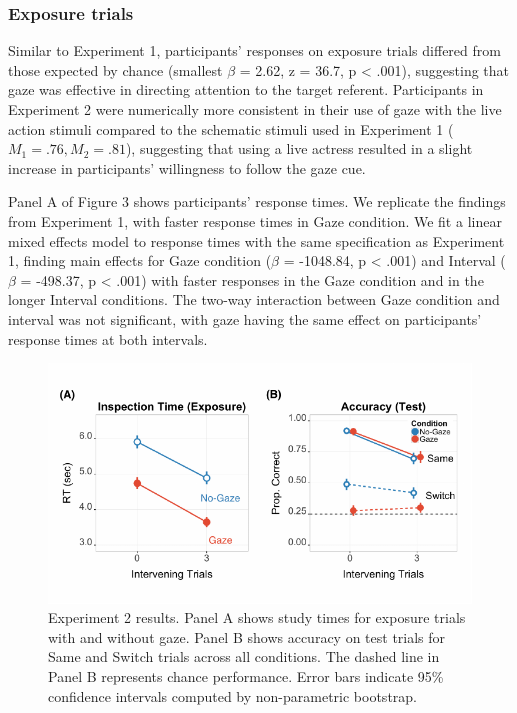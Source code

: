 \documentclass[authoryear, review]{elsarticle}
\newenvironment{CodeChunk}{}{}
\begin{document}
\subsubsection{Exposure trials}\label{exposure-trials-1}

Similar to Experiment 1, participants' responses on exposure trials
differed from those expected by chance (smallest \(\beta\) = 2.62, z =
36.7, p \textless{} .001), suggesting that gaze was effective in
directing attention to the target referent. Participants in Experiment 2
were numerically more consistent in their use of gaze with the live
action stimuli compared to the schematic stimuli used in Experiment 1
(\(M_1 = .76, M_2 = .81\)), suggesting that using a live actress
resulted in a slight increase in participants' willingness to follow the
gaze cue.

Panel A of Figure 3 shows participants' response times. We replicate the
findings from Experiment 1, with faster response times in Gaze
condition. We fit a linear mixed effects model to response times with
the same specification as Experiment 1, finding main effects for Gaze
condition (\(\beta\) = -1048.84, p \textless{} .001) and Interval
(\(\beta\) = -498.37, p \textless{} .001) with faster responses in the
Gaze condition and in the longer Interval conditions. The two-way
interaction between Gaze condition and interval was not significant,
with gaze having the same effect on participants' response times at both
intervals.

\begin{CodeChunk}
\begin{figure}[tb]
\includegraphics{figs/expt2-plot-1} \caption[Experiment 2 results]{Experiment 2 results. Panel A shows study times for exposure trials with and without gaze. Panel B shows accuracy on test trials for Same and Switch trials across all conditions. The dashed line in Panel B represents chance performance. Error bars indicate 95\% confidence intervals computed by non-parametric bootstrap.}\label{fig:expt2-plot}
\end{figure}
\end{CodeChunk}
\end{document}
